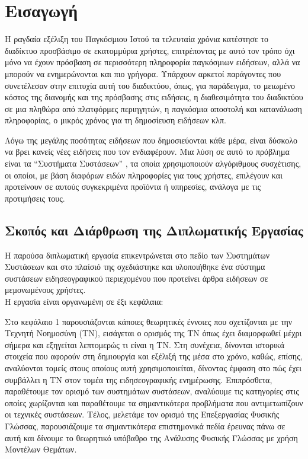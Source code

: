 \chapter{Εισαγωγή}

Η ραγδαία εξέλιξη του Παγκόσμιου Ιστού τα τελευταία χρόνια κατέστησε το διαδίκτυο
προσβάσιμο σε εκατομμύρια χρήστες, επιτρέποντας με αυτό τον τρόπο όχι μόνο να
έχουν πρόσβαση σε περισσότερη πληροφορία παγκόσμιων ειδήσεων, αλλά να μπορούν
να ενημερώνονται και πιο γρήγορα. 
Υπάρχουν αρκετοί παράγοντες που συνετέλεσαν στην επιτυχία αυτή του
διαδικτύου, όπως, για παράδειγμα, το μειωμένο κόστος της διανομής και της
πρόσβασης στις ειδήσεις, η διαθεσιμότητα του διαδικτύου σε μια πληθώρα από
πλατφόρμες περιηγητών, η παγκόσμια αποστολή και κατανάλωση πληροφορίας, ο
μικρός χρόνος για τη δημοσίευση ειδήσεων κλπ. 

\par Λόγω της μεγάλης ποσότητας ειδήσεων που δημοσιεύονται κάθε μέρα, 
είναι δύσκολο να βρει κανείς νέες ειδήσεις που τον ενδιαφέρουν. 
Μια λύση σε αυτό το πρόβλημα είναι τα “Συστήματα Συστάσεων” {}, 
τα οποία χρησιμοποιούν αλγόριθμους συσχέτισης, οι οποίοι, με βάση διαφόρων ειδών
πληροφορίες για τους χρήστες, επιλέγουν και προτείνουν σε αυτούς συγκεκριμένα
προϊόντα ή υπηρεσίες, ανάλογα με τις προτιμήσεις τους.

\newpage

\section{Σκοπός και Διάρθρωση της Διπλωματικής Εργασίας}
Η παρούσα διπλωματική εργασία επικεντρώνεται στο πεδίο των Συστημάτων Συστάσεων
και στο πλαίσιό της σχεδιάστηκε και υλοποιήθηκε
ένα σύστημα συστάσεων ειδησεογραφικού περιεχομένου που προτείνει άρθρα ειδήσεων σε μεμονωμένους χρήστες. \\

Η εργασία είναι οργανωμένη σε έξι κεφάλαια: \\

\par Στο κεφάλαιο 1 παρουσιάζονται κάποιες θεωρητικές έννοιες που σχετίζονται με την Τεχνητή Νοημοσύνη (ΤΝ), 
εισάγεται ο ορισμός της ΤΝ όπως έχει διαμορφωθεί μέχρι σήμερα και εξηγείται λεπτομερώς τι είναι η ΤΝ. 
Στη συνέχεια, δίνονται ιστορικά στοιχεία που αφορούν στη δημιουργία και εξέλιξή της μέσα στο χρόνο, 
καθώς, επίσης, αναλύονται τομείς στους οποίους αυτή χρησιμοποιείται, 
δίνοντας έμφαση στο πώς έχει συμβάλλει η ΤΝ στον τομέα της ειδησεογραφικής ενημέρωσης.
Επιπρόσθετα, παραθέτουμε τον ορισμό των συστημάτων συστάσεων, αναλύουμε τις κατηγορίες στις οποίες χωρίζονται 
και παραθέτουμε τα σημαντικότερα προβλήματα που αντιμετωπίζουν οι τεχνικές συστάσεων. 
Τέλος, μελετάμε τον ορισμό της Επεξεργασίας Φυσικής Γλώσσας, 
παρουσιάζουμε τα σημαντικότερα επιστημονικά πεδία έρευνας πάνω σε αυτή 
και δίνουμε το θεωρητικό υπόβαθρο της Ανάλυσης Φυσικής Γλώσσας με χρήση Μοντέλων Θεμάτων. \\


